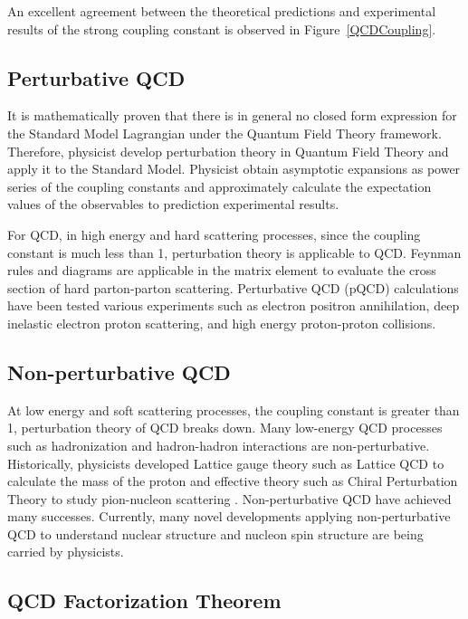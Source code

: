 An excellent agreement between the theoretical predictions and experimental results of the strong coupling constant is observed in Figure~\ref{QCDCoupling}. 

\subsection{Perturbative QCD}

It is mathematically proven that there is in general no closed form expression for the Standard Model Lagrangian under the Quantum Field Theory framework. Therefore, physicist develop perturbation theory in Quantum Field Theory and apply it to the Standard Model. Physicist obtain asymptotic expansions as power series of the coupling constants and approximately calculate the expectation values of the observables to prediction experimental results.

For QCD, in high energy and hard scattering processes, since the coupling constant is much less than 1, perturbation theory is applicable to QCD. Feynman rules and diagrams are applicable in the matrix element to evaluate the cross section of hard parton-parton scattering. Perturbative QCD (pQCD) calculations have been tested various experiments such as electron positron annihilation, deep inelastic electron proton scattering, and high energy proton-proton collisions.

\subsection{Non-perturbative QCD}

At low energy and soft scattering processes, the coupling constant is greater than 1, perturbation theory of QCD breaks down. Many low-energy QCD processes such as hadronization and hadron-hadron interactions are non-perturbative. Historically, physicists developed Lattice gauge theory such as Lattice QCD to calculate the mass \cite{LQCDProtonMass} of the proton and effective theory such as Chiral Perturbation Theory to study pion-nucleon scattering \cite{ChiPT}. Non-perturbative QCD have achieved many successes. Currently, many novel developments applying non-perturbative QCD to understand nuclear structure and nucleon spin structure are being carried by physicists.

\subsection{QCD Factorization Theorem}

